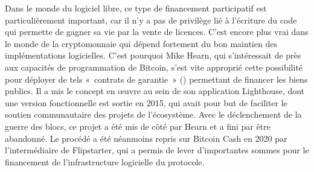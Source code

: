 Dans le monde du logiciel libre, ce type de financement participatif est particulièrement important, car il n'y a pas de privilège lié à l'écriture du code qui permette de gagner sa vie par la vente de licences. C'est encore plus vrai dans le monde de la cryptomonnaie qui dépend fortement du bon maintien des implémentations logicielles. C'est pourquoi Mike Hearn, qui s'intéressait de près aux capacités de programmation de Bitcoin, s'est vite approprié cette possibilité pour déployer de tels «~contrats de garantie~» () permettant de financer les biens publics. Il a mis le concept en œuvre au sein de son application Lighthouse, dont une version fonctionnelle est sortie en 2015, qui avait pour but de faciliter le soutien communautaire des projets de l'écosystème. Avec le déclenchement de la guerre des blocs, ce projet a été mis de côté par Hearn et a fini par être abandonné. Le procédé a été néanmoins repris sur Bitcoin Cash en 2020 par l'intermédiaire de Flipstarter, qui a permis de lever d'importantes sommes pour le financement de l'infrastructure logicielle du protocole. %


